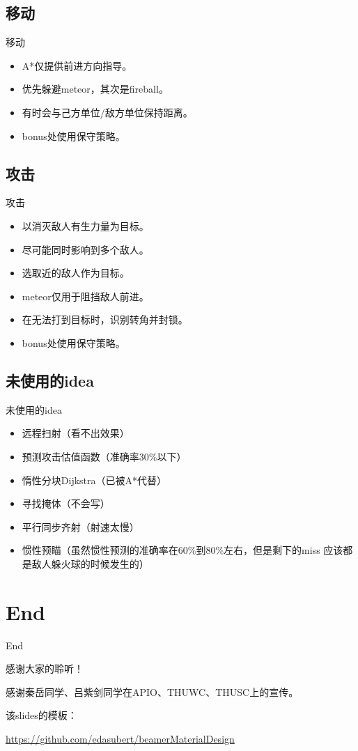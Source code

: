 \documentclass[aspectratio=43,compress]{beamer}
\begin{document}
\subsection{移动}
\begin{frame}{移动}
\begin{card}
\begin{itemize}
\item A*仅提供前进方向指导。
\item 优先躲避meteor，其次是fireball。
\item 有时会与己方单位/敌方单位保持距离。
\item bonus处使用保守策略。
\end{itemize}
\end{card}
\end{frame}
\subsection{攻击}
\begin{frame}{攻击}
\begin{card}
\begin{itemize}
\item 以消灭敌人有生力量为目标。
\item 尽可能同时影响到多个敌人。
\item 选取近的敌人作为目标。
\item meteor仅用于阻挡敌人前进。
\item 在无法打到目标时，识别转角并封锁。
\item bonus处使用保守策略。
\end{itemize}
\end{card}
\end{frame}
\subsection{未使用的idea}
\begin{frame}{未使用的idea}
\begin{card}
\begin{itemize}
    \item 远程扫射（看不出效果）
    \item 预测攻击估值函数（准确率30\%以下）
    \item 惰性分块Dijkstra（已被A*代替）
    \item 寻找掩体（不会写）
    \item 平行同步齐射（射速太慢）
    \item 惯性预瞄（虽然惯性预测的准确率在60\%到80\%左右，但是剩下的miss
    应该都是敌人躲火球的时候发生的）
\end{itemize}
\end{card}
\end{frame}

\section{End}
\begin{frame}{End}
\begin{card}
感谢大家的聆听！

感谢秦岳同学、吕紫剑同学在APIO、THUWC、THUSC上的宣传。

该slides的模板：

{\footnotesize \url{https://github.com/edasubert/beamerMaterialDesign}}
\end{card}
\end{frame}
\end{document}
